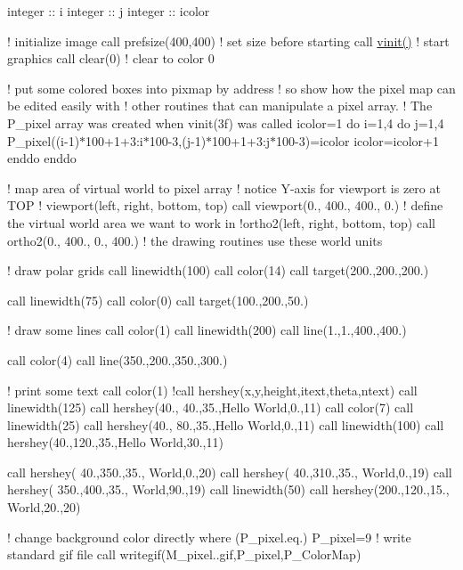 integer \+:\+: i integer \+:\+: j integer \+:\+: icolor

! initialize image call prefsize(400,400) ! set size before starting call \hyperlink{namespacem__pixel_ac03ca8f23fdadb60599b6ea4dc87a6d9}{vinit()} ! start graphics call clear(0) ! clear to color 0

! put some colored boxes into pixmap by address ! so show how the pixel map can be edited easily with ! other routines that can manipulate a pixel array. ! The P\+\_\+pixel array was created when vinit(3f) was called icolor=1 do i=1,4 do j=1,4 P\+\_\+pixel((i-\/1)$\ast$100+1+3\+:i$\ast$100-\/3,(j-\/1)$\ast$100+1+3\+:j$\ast$100-\/3)=icolor icolor=icolor+1 enddo enddo

! map area of virtual world to pixel array ! notice Y-\/axis for viewport is zero at T\+OP ! viewport(left, right, bottom, top) call viewport(0., 400., 400., 0.) ! define the virtual world area we want to work in !ortho2(left, right, bottom, top) call ortho2(0., 400., 0., 400.) ! the drawing routines use these world units

! draw polar grids call linewidth(100) call color(14) call target(200.,200.,200.)

call linewidth(75) call color(0) call target(100.,200.,50.)

! draw some lines call color(1) call linewidth(200) call line(1.,1.,400.,400.)

call color(4) call line(350.,200.,350.,300.)

! print some text call color(1) !call hershey(x,y,height,itext,theta,ntext) call linewidth(125) call hershey(40., 40.,35.,\textquotesingle{}Hello World\textquotesingle{},0.,11) call color(7) call linewidth(25) call hershey(40., 80.,35.,\textquotesingle{}Hello World\textquotesingle{},0.,11) call linewidth(100) call hershey(40.,120.,35.,\textquotesingle{}Hello World\textquotesingle{},30.,11)

call hershey( 40.,350.,35.,\textquotesingle{} World\textquotesingle{},0.,20) call hershey( 40.,310.,35.,\textquotesingle{} World\textquotesingle{},0.,19) call hershey( 350.,400.,35.,\textquotesingle{} World\textquotesingle{},90.,19) call linewidth(50) call hershey(200.,120.,15.,\textquotesingle{} World\textquotesingle{},20.,20)

! change background color directly where (P\+\_\+pixel.\+eq.) P\+\_\+pixel=9 ! write standard gif file call writegif(\textquotesingle{}M\+\_\+pixel..\+gif\textquotesingle{},P\+\_\+pixel,P\+\_\+\+Color\+Map)

